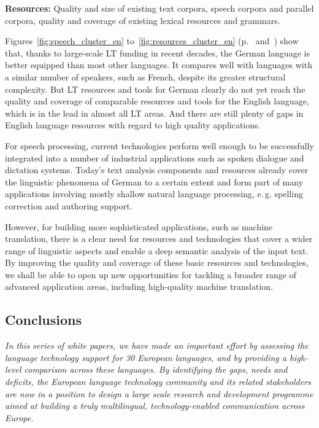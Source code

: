 \documentclass[]{../../metanetpaper}
\begin{document}
\begin{multicols}{2}
\textbf{Resources:} Quality and size of existing text corpora, speech corpora and parallel corpora, quality and coverage of existing lexical resources and grammars.

Figures~\ref{fig:speech_cluster_en} to~\ref{fig:resources_cluster_en} (p.~\pageref{fig:speech_cluster_en} and~\pageref{fig:resources_cluster_en}) show that, thanks to large-scale LT funding in recent decades, the German language is better equipped than most other languages. It compares well with languages with a similar number of speakers, such as French, despite its greater structural complexity. But LT resources and tools for German clearly do not yet reach the quality and coverage of comparable resources and tools for the English language, which is in the lead in almost all LT areas. And there are still plenty of gaps in English language resources with regard to high quality applications.

For speech processing, current technologies perform well enough to be successfully integrated into a number of industrial applications such as spoken dialogue and dictation systems. Today’s text analysis components and resources already cover the linguistic phenomena of German to a certain extent and form part of many applications involving mostly shallow natural language processing, e.\,g. spelling correction and authoring support.

However, for building more sophisticated applications, such as machine translation, there is a clear need for resources and technologies that cover a wider range of linguistic aspects and enable a deep semantic analysis of the input text. By improving the quality and coverage of these basic resources and technologies, we shall be able to open up new opportunities for tackling a broader range of advanced application areas, including high-quality machine translation.

\subsection{Conclusions}

\emph{In this series of white papers, we have made an important effort by assessing the language technology support for 30 European languages, and by providing a high-level comparison across these languages. By identifying the gaps, needs and deficits, the European language technology community and its related stakeholders are now in a position to design a large scale research and development programme aimed at building a truly multilingual, technology-enabled communication across Europe.}


\end{multicols}
\end{document}
